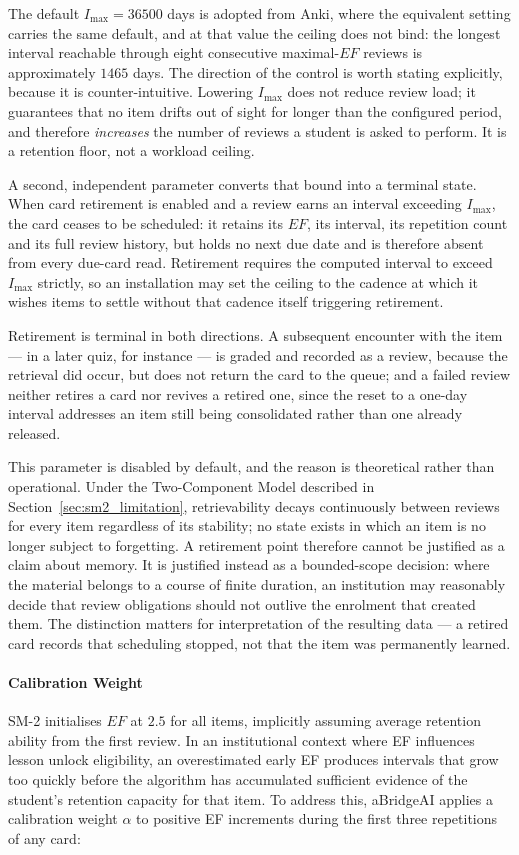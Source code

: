 The default $I_{\max} = 36500$ days is adopted from Anki, where the equivalent setting carries the same default, and at that value the ceiling does not bind: the longest interval reachable through eight consecutive maximal-$EF$ reviews is approximately $1465$ days. The direction of the control is worth stating explicitly, because it is counter-intuitive. Lowering $I_{\max}$ does not reduce review load; it guarantees that no item drifts out of sight for longer than the configured period, and therefore \textit{increases} the number of reviews a student is asked to perform. It is a retention floor, not a workload ceiling.

A second, independent parameter converts that bound into a terminal state. When card retirement is enabled and a review earns an interval exceeding $I_{\max}$, the card ceases to be scheduled: it retains its $EF$, its interval, its repetition count and its full review history, but holds no next due date and is therefore absent from every due-card read. Retirement requires the computed interval to exceed $I_{\max}$ strictly, so an installation may set the ceiling to the cadence at which it wishes items to settle without that cadence itself triggering retirement.

Retirement is terminal in both directions. A subsequent encounter with the item --- in a later quiz, for instance --- is graded and recorded as a review, because the retrieval did occur, but does not return the card to the queue; and a failed review neither retires a card nor revives a retired one, since the reset to a one-day interval addresses an item still being consolidated rather than one already released.

This parameter is disabled by default, and the reason is theoretical rather than operational. Under the Two-Component Model described in Section~\ref{sec:sm2_limitation}, retrievability decays continuously between reviews for every item regardless of its stability; no state exists in which an item is no longer subject to forgetting. A retirement point therefore cannot be justified as a claim about memory. It is justified instead as a bounded-scope decision: where the material belongs to a course of finite duration, an institution may reasonably decide that review obligations should not outlive the enrolment that created them. The distinction matters for interpretation of the resulting data --- a retired card records that scheduling stopped, not that the item was permanently learned.

\paragraph{Calibration Weight}
SM-2 initialises $EF$ at $2.5$ for all items, implicitly assuming average retention ability from the first review. In an institutional context where EF influences lesson unlock eligibility, an overestimated early EF produces intervals that grow too quickly before the algorithm has accumulated sufficient evidence of the student's retention capacity for that item. To address this, aBridgeAI applies a calibration weight $\alpha$ to positive EF increments during the first three repetitions of any card:

